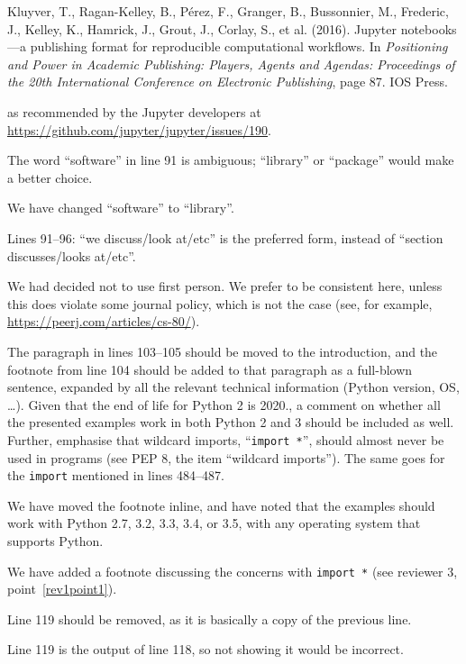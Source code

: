 \documentclass[answers,12pt]{exam}
\begin{document}
\begin{questions}
\begin{solution}
Kluyver, T., Ragan-Kelley, B., P{\'e}rez, F.,
Granger, B., Bussonnier, M., Frederic, J., Kelley, K., Hamrick, J., Grout,
J., Corlay, S., et al. (2016). Jupyter notebooks---a publishing format for
reproducible computational workflows. In \textit{Positioning and Power in Academic
Publishing: Players, Agents and Agendas: Proceedings of the 20th International
Conference on Electronic Publishing}, page 87. IOS Press.

as recommended by the Jupyter developers at \url{https://github.com/jupyter/jupyter/issues/190}.
\end{solution}

\question The word ``software'' in line 91 is ambiguous; ``library'' or ``package'' would make a better choice.
\begin{solution}
We have changed ``software'' to ``library''.
\end{solution}

\question Lines 91--96: ``we discuss/look at/etc'' is the preferred form, instead of ``section discusses/looks at/etc''.
\begin{solution}
We had decided not to use first person.  We prefer to be
consistent here, unless this does violate some journal policy,
which is not the case (see, for example,
\url{https://peerj.com/articles/cs-80/}).
\end{solution}

\question The paragraph in lines 103--105 should be moved to the introduction,
and the footnote from line 104 should be added to that paragraph as a
full-blown sentence, expanded by all the relevant technical information
(Python version, OS, \ldots). Given that the end of life for Python 2 is
2020., a comment on whether all the presented examples work in both Python 2
and 3 should be included as well. Further, emphasise that wildcard imports,
``\texttt{import *}'', should almost never be used in programs (see PEP 8, the
item ``wildcard imports''). The same goes for the \texttt{import} mentioned in lines 484--487.
\begin{solution}
We have moved the footnote inline, and have noted that the examples should
work with Python 2.7, 3.2, 3.3, 3.4, or 3.5, with any operating system that
supports Python.

We have added a footnote discussing the concerns with \texttt{import *} (see
reviewer 3, point~\ref{rev1point1}).
\end{solution}

\question Line 119 should be removed, as it is basically a copy of the previous line.
\begin{solution}
Line 119 is the output of line 118, so not showing it would
be incorrect.


\end{solution}
\end{questions}
\end{document}
